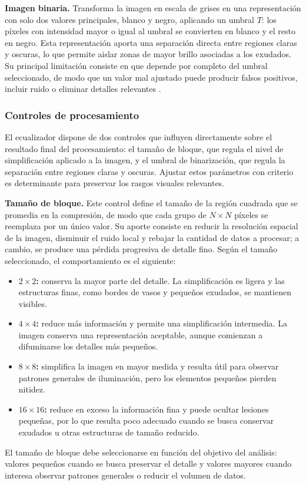 \documentclass[11pt]{article}
\begin{document}
\textbf{Imagen binaria.} Transforma la imagen en escala de grises en una representación con solo dos valores principales, blanco y negro, aplicando un umbral $T$: los píxeles con intensidad mayor o igual al umbral se convierten en blanco y el resto en negro. Esta representación aporta una separación directa entre regiones claras y oscuras, lo que permite aislar zonas de mayor brillo asociadas a los exudados. Su principal limitación consiste en que depende por completo del umbral seleccionado, de modo que un valor mal ajustado puede producir falsos positivos, incluir ruido o eliminar detalles relevantes \cite{b4}.

\subsubsection{Controles de procesamiento}

El ecualizador dispone de dos controles que influyen directamente sobre el resultado final del procesamiento: el tamaño de bloque, que regula el nivel de simplificación aplicado a la imagen, y el umbral de binarización, que regula la separación entre regiones claras y oscuras. Ajustar estos parámetros con criterio es determinante para preservar los rasgos visuales relevantes.

\textbf{Tamaño de bloque.} Este control define el tamaño de la región cuadrada que se promedia en la compresión, de modo que cada grupo de $N \times N$ píxeles se reemplaza por un único valor. Su aporte consiste en reducir la resolución espacial de la imagen, disminuir el ruido local y rebajar la cantidad de datos a procesar; a cambio, se produce una pérdida progresiva de detalle fino. Según el tamaño seleccionado, el comportamiento es el siguiente:
\begin{itemize}
    \item \textbf{$2 \times 2$:} conserva la mayor parte del detalle. La simplificación es ligera y las estructuras finas, como bordes de vasos y pequeños exudados, se mantienen visibles.
    \item \textbf{$4 \times 4$:} reduce más información y permite una simplificación intermedia. La imagen conserva una representación aceptable, aunque comienzan a difuminarse los detalles más pequeños.
    \item \textbf{$8 \times 8$:} simplifica la imagen en mayor medida y resulta útil para observar patrones generales de iluminación, pero los elementos pequeños pierden nitidez.
    \item \textbf{$16 \times 16$:} reduce en exceso la información fina y puede ocultar lesiones pequeñas, por lo que resulta poco adecuado cuando se busca conservar exudados u otras estructuras de tamaño reducido.
\end{itemize}
El tamaño de bloque debe seleccionarse en función del objetivo del análisis: valores pequeños cuando se busca preservar el detalle y valores mayores cuando interesa observar patrones generales o reducir el volumen de datos.
\end{document}
